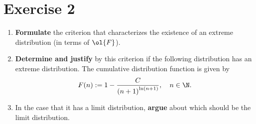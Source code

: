 \section{Exercise 2}

\begin{enumerate}
    \item \textbf{Formulate} the criterion that characterizes the existence of an extreme distribution (in terms of $\ol{F}$).
    \item \textbf{Determine and justify} by this criterion if the following distribution has an extreme distribution. The cumulative distribution function is given by
    \[  F(n) := 1-\frac{C}{{(n+1)}^{\ln (n+1)}} ,\hspace*{1em} n\in\N.\]
    \item In the case that it has a limit distribution, \textbf{argue} about which should be the limit distribution.
\end{enumerate}

